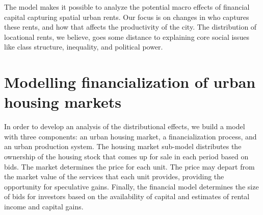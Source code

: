 The model makes it possible to analyze the potential macro effects of financial capital capturing spatial urban rents. Our focus is on changes in who captures these rents, and how that affects the productivity of the city. The distribution of locational rents, we believe, goes some distance to explaining core social issues like class structure, inequality, and political power.

\section{Modelling financialization of urban housing markets}
In order to develop an analysis of the distributional effects, we build a model with three components: an urban housing market, a financialization process, and an urban production system. The housing market sub-model distributes the ownership of the housing stock that comes up for sale in each period based on bids. %
The market determines the price for each unit. The price may depart from the market value of the services that each unit provides, providing the opportunity for speculative gains. Finally, the financial model determines the size of bids for investors based on the availability of capital and estimates of rental income and capital gains.


